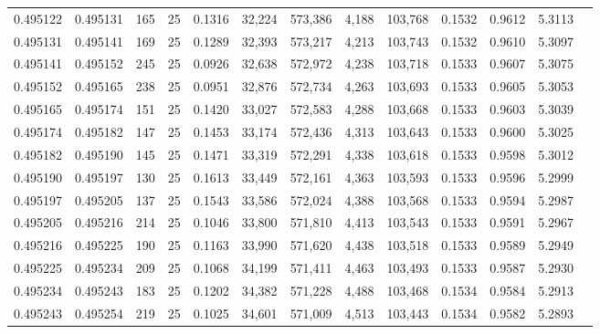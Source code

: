 \begin{tabular}{rrrrrrrrrrrrr}
0.495122 & 0.495131 & 165 &  25 &                                     0.1316 &  32,224 & 573,386 &   4,188 & 103,768 & 0.1532 & 0.9612 & 5.3113 \\
0.495131 & 0.495141 & 169 &  25 &                                     0.1289 &  32,393 & 573,217 &   4,213 & 103,743 & 0.1532 & 0.9610 & 5.3097 \\
0.495141 & 0.495152 & 245 &  25 &                                     0.0926 &  32,638 & 572,972 &   4,238 & 103,718 & 0.1533 & 0.9607 & 5.3075 \\
0.495152 & 0.495165 & 238 &  25 &                                     0.0951 &  32,876 & 572,734 &   4,263 & 103,693 & 0.1533 & 0.9605 & 5.3053 \\
0.495165 & 0.495174 & 151 &  25 &                                     0.1420 &  33,027 & 572,583 &   4,288 & 103,668 & 0.1533 & 0.9603 & 5.3039 \\
0.495174 & 0.495182 & 147 &  25 &                                     0.1453 &  33,174 & 572,436 &   4,313 & 103,643 & 0.1533 & 0.9600 & 5.3025 \\
0.495182 & 0.495190 & 145 &  25 &                                     0.1471 &  33,319 & 572,291 &   4,338 & 103,618 & 0.1533 & 0.9598 & 5.3012 \\
0.495190 & 0.495197 & 130 &  25 &                                     0.1613 &  33,449 & 572,161 &   4,363 & 103,593 & 0.1533 & 0.9596 & 5.2999 \\
0.495197 & 0.495205 & 137 &  25 &                                     0.1543 &  33,586 & 572,024 &   4,388 & 103,568 & 0.1533 & 0.9594 & 5.2987 \\
0.495205 & 0.495216 & 214 &  25 &                                     0.1046 &  33,800 & 571,810 &   4,413 & 103,543 & 0.1533 & 0.9591 & 5.2967 \\
0.495216 & 0.495225 & 190 &  25 &                                     0.1163 &  33,990 & 571,620 &   4,438 & 103,518 & 0.1533 & 0.9589 & 5.2949 \\
0.495225 & 0.495234 & 209 &  25 &                                     0.1068 &  34,199 & 571,411 &   4,463 & 103,493 & 0.1533 & 0.9587 & 5.2930 \\
0.495234 & 0.495243 & 183 &  25 &                                     0.1202 &  34,382 & 571,228 &   4,488 & 103,468 & 0.1534 & 0.9584 & 5.2913 \\
0.495243 & 0.495254 & 219 &  25 &                                     0.1025 &  34,601 & 571,009 &   4,513 & 103,443 & 0.1534 & 0.9582 & 5.2893 \\

\end{tabular}
